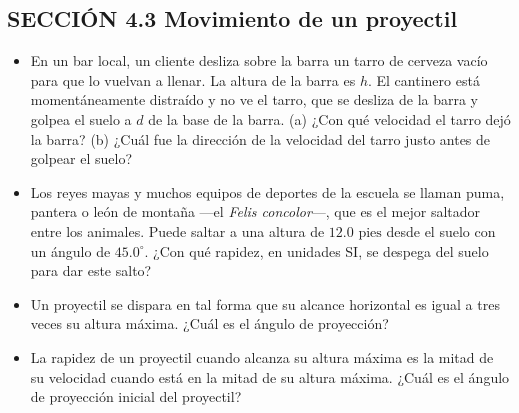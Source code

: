 \documentclass[11pt,a4paper]{article}
\begin{document}
\newpage

\subsection*{SECCIÓN 4.3 Movimiento de un proyectil}

\begin{itemize}
    \item[\textbf{6.}] En un bar local, un cliente desliza sobre la barra un tarro de cerveza vacío para que lo vuelvan a llenar. La altura de la barra es $h$. El cantinero está momentáneamente distraído y no ve el tarro, que se desliza de la barra y golpea el suelo a $d$ de la base de la barra. (a) ¿Con qué velocidad el tarro dejó la barra? (b) ¿Cuál fue la dirección de la velocidad del tarro justo antes de golpear el suelo?
    \vspace*{6cm}

    \item[\textbf{7.}] Los reyes mayas y muchos equipos de deportes de la escuela se llaman puma, pantera o león de montaña —el \textit{Felis concolor}—, que es el mejor saltador entre los animales. Puede saltar a una altura de $12.0 \text{ pies}$ desde el suelo con un ángulo de $45.0^\circ$. ¿Con qué rapidez, en unidades SI, se despega del suelo para dar este salto?
    \vspace*{5cm}

    \item[\textbf{8.}] Un proyectil se dispara en tal forma que su alcance horizontal es igual a tres veces su altura máxima. ¿Cuál es el ángulo de proyección?
    \vspace*{5cm}

    \item[\textbf{9.}] La rapidez de un proyectil cuando alcanza su altura máxima es la mitad de su velocidad cuando está en la mitad de su altura máxima. ¿Cuál es el ángulo de proyección inicial del proyectil?
    \vspace*{6cm}
\end{itemize}

\newpage
\end{document}
